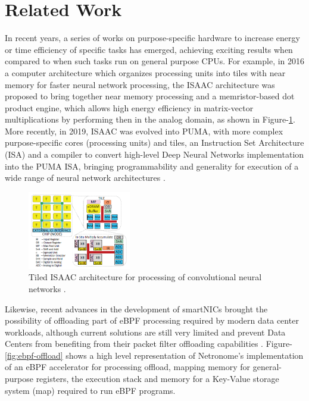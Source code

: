 \documentclass[conference]{IEEEtran}
\begin{document}
\section{Related Work}
\label{sec:rel-works}

In recent years, a series of works on purpose-specific hardware to increase energy or time efficiency of specific tasks has emerged, achieving exciting results when compared to when such tasks run on general purpose CPUs. For example, in 2016 a computer architecture which organizes processing units into tiles with near memory for faster neural network processing, the ISAAC \cite{shafiee2016isaac} architecture was proposed to bring together near memory processing and a memristor-based dot product engine, which allows high energy efficiency in matrix-vector multiplications by performing then in the analog domain, as shown in Figure-\ref{fig:isaac}. More recently, in 2019, ISAAC was evolved into PUMA, with more complex purpose-specific cores (processing units) and tiles, an Instruction Set Architecture (ISA) and a compiler to convert high-level Deep Neural Networks implementation into the PUMA ISA, bringing programmability and generality for execution of a wide range of neural network architectures \cite{ankit2019puma}.

\begin{figure}[ht]
    \centering
    \includegraphics[width=0.4\textwidth]{figures/isaac.png}
    \caption{Tiled ISAAC architecture for processing of convolutional neural networks \cite{shafiee2016isaac}.}
    \label{fig:isaac}
\end{figure}

Likewise, recent advances in the development of smartNICs brought the possibility of offloading part of eBPF processing required by modern data center workloads, although current solutions are still very limited and prevent Data Centers from benefiting from their packet filter offloading capabilities \cite{miano:2019:smartnics-ddos}. Figure-\ref{fig:ebpf-offload} shows a high level representation of Netronome's implementation of an eBPF accelerator for processing offload, mapping memory for general-purpose registers, the execution stack and memory for a Key-Value storage system (map) required to run eBPF programs.
\end{document}
